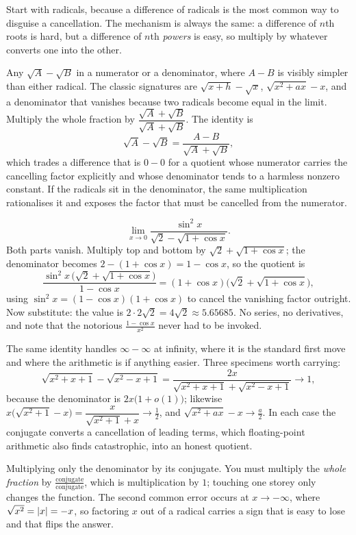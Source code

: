 Start with radicals, because a difference of radicals is the most common way to disguise a cancellation. The mechanism is always the same: a difference of $n$th roots is hard, but a difference of $n$th \emph{powers} is easy, so multiply by whatever converts one into the other.

\cue Any $\sqrt{A}-\sqrt{B}$ in a numerator or a denominator, where $A-B$ is visibly simpler than either radical. The classic signatures are $\sqrt{x+h}-\sqrt{x}$, $\sqrt{x^{2}+ax}-x$, and a denominator that vanishes because two radicals become equal in the limit.
\method Multiply the whole fraction by $\dfrac{\sqrt A+\sqrt B}{\sqrt A+\sqrt B}$. The identity is
\[\sqrt{A}-\sqrt{B}=\frac{A-B}{\sqrt{A}+\sqrt{B}},\]
which trades a difference that is $0-0$ for a quotient whose numerator carries the cancelling factor explicitly and whose denominator tends to a harmless nonzero constant. If the radicals sit in the denominator, the same multiplication rationalises it and exposes the factor that must be cancelled from the numerator.

\begin{worked}
\[\lim_{x\to0}\frac{\sin^{2}x}{\sqrt{2}-\sqrt{1+\cos x}}.\]
Both parts vanish. Multiply top and bottom by $\sqrt2+\sqrt{1+\cos x}$; the denominator becomes $2-(1+\cos x)=1-\cos x$, so the quotient is
\[\frac{\sin^{2}x\,\bigl(\sqrt2+\sqrt{1+\cos x}\bigr)}{1-\cos x}=(1+\cos x)\bigl(\sqrt2+\sqrt{1+\cos x}\bigr),\]
using $\sin^{2}x=(1-\cos x)(1+\cos x)$ to cancel the vanishing factor outright. Now substitute: the value is $2\cdot 2\sqrt2=4\sqrt2\approx5.65685$. No series, no derivatives, and note that the notorious $\tfrac{1-\cos x}{x^{2}}$ never had to be invoked.
\end{worked}

The same identity handles $\infty-\infty$ at infinity, where it is the standard first move and where the arithmetic is if anything easier. Three specimens worth carrying:
\[\sqrt{x^{2}+x+1}-\sqrt{x^{2}-x+1}=\frac{2x}{\sqrt{x^{2}+x+1}+\sqrt{x^{2}-x+1}}\longrightarrow1,\]
because the denominator is $2x\bigl(1+o(1)\bigr)$; likewise $x\bigl(\sqrt{x^{2}+1}-x\bigr)=\dfrac{x}{\sqrt{x^{2}+1}+x}\to\tfrac12$, and $\sqrt{x^{2}+ax}-x\to\tfrac a2$. In each case the conjugate converts a cancellation of leading terms, which floating-point arithmetic also finds catastrophic, into an honest quotient.

\begin{trap}
Multiplying only the denominator by its conjugate. You must multiply the \emph{whole fraction} by $\tfrac{\text{conjugate}}{\text{conjugate}}$, which is multiplication by $1$; touching one storey only changes the function. The second common error occurs at $x\to-\infty$, where $\sqrt{x^{2}}=\left\lvert x\right\rvert=-x$, so factoring $x$ out of a radical carries a sign that is easy to lose and that flips the answer.
\end{trap}

